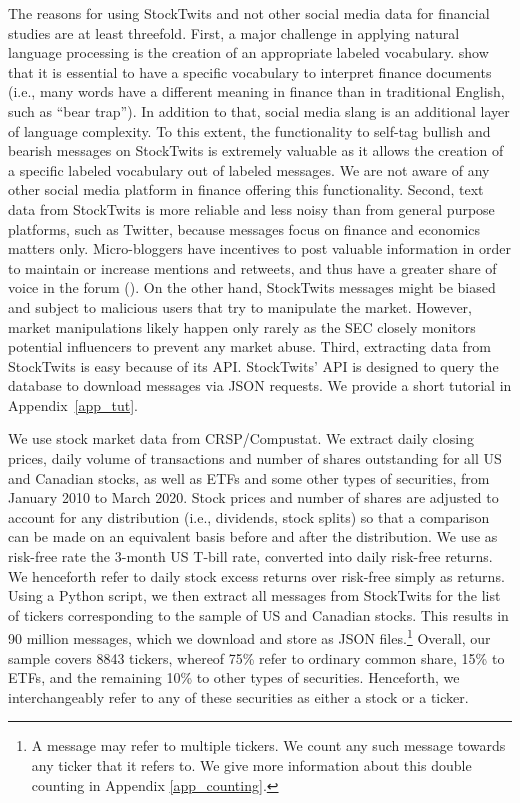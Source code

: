 The reasons for using StockTwits and not other social media data for financial studies are at least threefold. First, a major challenge in applying natural language processing is the creation of an appropriate labeled vocabulary. \citet{loughran2011barron} show that it is essential to have a specific vocabulary to interpret finance documents (i.e., many words have a different meaning in finance than in traditional English, such as “bear trap”). In addition to that, social media slang is an additional layer of language complexity. To this extent, the functionality to self-tag bullish and bearish messages on StockTwits is extremely valuable as it allows the creation of a specific labeled vocabulary out of labeled messages. We are not aware of any other social media platform in finance offering this functionality. Second, text data from StockTwits is more reliable and less noisy than from general purpose platforms, such as Twitter, because messages focus on finance and economics matters only. Micro-bloggers have incentives to post valuable information in order to maintain or increase mentions and retweets, and thus have a greater share of voice in the forum (\citet{sprenger2014tweets}). On the other hand, StockTwits messages might be biased and subject to malicious users that try to manipulate the market. However, market manipulations likely happen only rarely as the SEC closely monitors potential influencers to prevent any market abuse. Third, extracting data from StockTwits is easy because of its API. StockTwits' API is designed to query the database to download messages via JSON requests. We provide a short tutorial in Appendix~\ref{app_tut}.

We use stock market data from CRSP/Compustat. We extract daily closing prices, daily volume of transactions and number of shares outstanding for all US and Canadian stocks, as well as ETFs and some other types of securities, from January 2010 to March 2020. Stock prices and number of shares are adjusted to account for any distribution (i.e., dividends, stock splits) so that a comparison can be made on an equivalent basis before and after the distribution. We use as risk-free rate the 3-month US T-bill rate, converted into daily risk-free returns. We henceforth refer to daily stock excess returns over risk-free simply as returns. Using a Python script, we then extract all messages from StockTwits for the list of tickers corresponding to the sample of US and Canadian stocks. This results in 90 million messages, which we download and store as JSON files.\footnote{A message may refer to multiple tickers. We count any such message towards any ticker that it refers to. We give more information about this double counting in Appendix \ref{app_counting}.} Overall, our sample covers 8843 tickers, whereof 75\% refer to ordinary common share, 15\% to ETFs, and the remaining 10\% to other types of securities. Henceforth, we interchangeably refer to any of these securities as either a stock or a ticker. 

